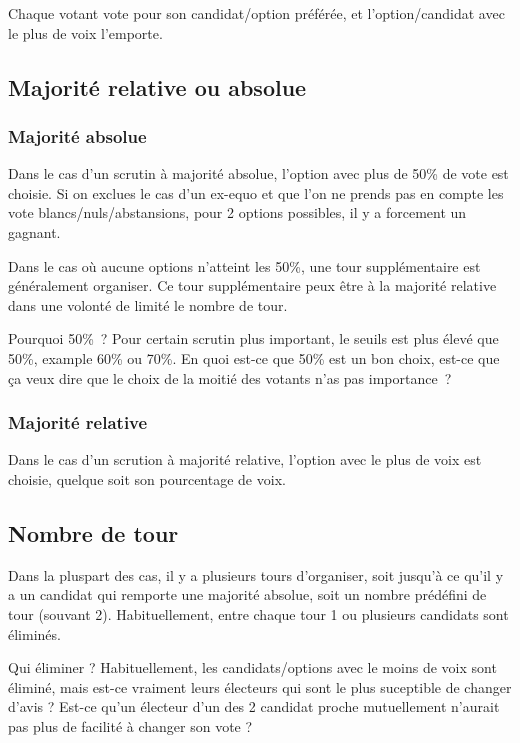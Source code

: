 \documentclass[../report]{subfiles}
\begin{document}
  Chaque votant vote pour son candidat/option préférée, et l'option/candidat avec le plus de
  voix l'emporte.
  
  \subsection{Majorité relative ou absolue}
  \subsubsection{Majorité absolue}
  Dans le cas d'un scrutin à majorité absolue, l'option avec plus de 50\% de vote est choisie.
  Si on exclues le cas d'un ex-equo et que l'on ne prends pas en compte les vote 
  blancs/nuls/abstansions, pour 2 options possibles, il y a forcement un gagnant.
  
  Dans le cas où aucune options n'atteint les 50\%, une tour supplémentaire est généralement
  organiser.
  Ce tour supplémentaire peux être à la majorité relative dans une volonté de limité le nombre
  de tour.
  
  \begin{nota}{Pourquoi 50\%~?}
    Pour certain scrutin plus important, le seuils est plus élevé que 50\%, example 60\% ou 70\%. 
    En quoi est-ce que 50\% est un bon choix, est-ce que ça veux dire que le choix de la moitié
    des votants n'as pas importance~? 
  \end{nota}
  
  \subsubsection{Majorité relative}
  Dans le cas d'un scrution à majorité relative, l'option avec le plus de voix est choisie, 
  quelque soit son pourcentage de voix.
  
  \subsection{Nombre de tour}
  
  Dans la pluspart des cas, il y a plusieurs tours d'organiser, soit jusqu'à ce qu'il y a 
  un candidat qui remporte une majorité absolue, soit un nombre prédéfini de tour (souvant 2).
  Habituellement, entre chaque tour 1 ou plusieurs candidats sont éliminés.
  
  \begin{nota}{Qui éliminer ?}
    Habituellement, les candidats/options avec le moins de voix sont éliminé, mais
    est-ce vraiment leurs électeurs qui sont le plus suceptible de changer d'avis ?
    Est-ce qu'un électeur d'un des 2 candidat proche mutuellement n'aurait pas plus
    de facilité à changer son vote ?
  \end{nota}
\end{document}
